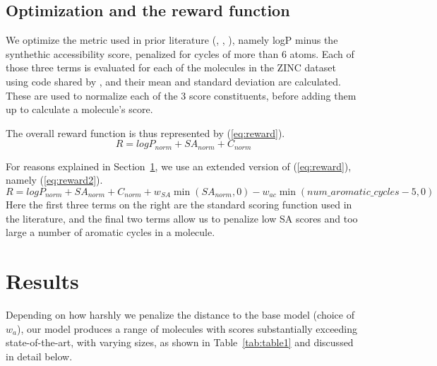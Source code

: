 \documentclass{article}
\begin{document}
\subsection{Optimization and the reward function}\label{sec:reward}
We optimize the metric used in prior literature (\cite{Gomez-Bombarelli16}, \cite{kusner17}, \cite{jin18}), namely logP minus the synthethic accessibility score, penalized for cycles of more than 6 atoms. Each of those three terms is evaluated for each of the molecules in the ZINC dataset using code shared by \cite{kusner17}, and their mean and standard deviation are calculated. These are used to normalize each of the 3 score constituents, before adding them up to calculate a molecule's score.

The overall reward function is thus represented by (\ref{eq:reward}). 
\begin{equation}\label{eq:reward}
R = logP_{norm} + SA_{norm} + C_{norm}
\end{equation}

For reasons explained in Section~\ref{sec:results}, we use an extended version of (\ref{eq:reward}), namely (\ref{eq:reward2}).
\begin{equation}\label{eq:reward2}
R = logP_{norm} + SA_{norm} + C_{norm} + w_{SA} \min\left( SA_{norm}, 0\right) - w_{ac} \min\left( num\_aromatic\_cycles -5, 0\right)
\end{equation}
Here the first three terms on the right are the standard scoring function used in the literature, and the final two terms allow us to penalize low SA scores and too large a number of aromatic cycles in a molecule.





\section{Results}\label{sec:results}
Depending on how harshly we penalize the distance to the base model (choice of $w_a$), our model produces a range of molecules with scores substantially exceeding state-of-the-art, with varying sizes, as shown in Table~\ref{tab:table1} and discussed in detail below.
\end{document}
